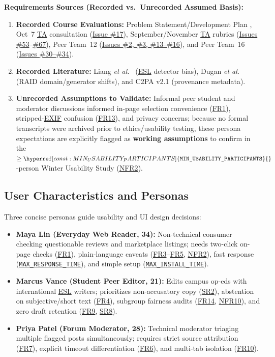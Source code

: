 \documentclass[11pt]{article}
\newcommand{\MinUsabilityParticipants}{\hyperref[const:MIN_USABILITY_PARTICIPANTS]{\texttt{MIN\_\allowbreak{}USABILITY\_\allowbreak{}PARTICIPANTS}}}
\newcommand{\MaxResponseTime}{\hyperref[const:MAX_RESPONSE_TIME]{\texttt{MAX\_\allowbreak{}RESPONSE\_\allowbreak{}TIME}}}
\newcommand{\MaxInstallTime}{\hyperref[const:MAX_INSTALL_TIME]{\texttt{MAX\_\allowbreak{}INSTALL\_\allowbreak{}TIME}}}
\newcommand{\ESL}{\hyperlink{acr-esl}{ESL}}
\newcommand{\EXIF}{\hyperlink{acr-exif}{EXIF}}
\newcommand{\TA}{\hyperlink{acr-ta}{TA}}
\begin{document}
\noindent\textbf{Requirements Sources (Recorded vs.\ Unrecorded Assumed Basis):}
\begin{enumerate}[leftmargin=*, noitemsep]
    \item \textbf{Recorded Course Evaluations:} Problem Statement/Development Plan \cite{VerityDevPlan2026}, Oct~7 \TA{} consultation (\href{https://github.com/richy1337/Verity/issues/17}{Issue \#17}), September/November \TA{} rubrics (\href{https://github.com/richy1337/Verity/issues/53}{Issues \#53}--\href{https://github.com/richy1337/Verity/issues/67}{\#67}), Peer Team~12 (\href{https://github.com/richy1337/Verity/issues/2}{Issues \#2, \#3, \#13--\#16}), and Peer Team~16 (\href{https://github.com/richy1337/Verity/issues/30}{Issues \#30--\#34}).
    \item \textbf{Recorded Literature:} Liang \emph{et al.}\ \cite{Liang2023ESL} (\ESL{} detector bias), Dugan \emph{et al.}\ \cite{RaidBenchmark2024} (RAID domain/generator shifts), and C2PA v2.1 \cite{C2PASpec2024} (provenance metadata).
    \item \textbf{Unrecorded Assumptions to Validate:} Informal peer student and moderator discussions informed in-page selection convenience (\hyperref[FR1]{FR1}), stripped-\EXIF{} confusion (\hyperref[FR13]{FR13}), and privacy concerns; because no formal transcripts were archived prior to ethics/usability testing, these persona expectations are explicitly flagged as \textbf{working assumptions} to confirm in the $\ge \MinUsabilityParticipants{}$-person Winter Usability Study (\hyperref[NFR2]{NFR2}).
\end{enumerate}

\subsection{User Characteristics and Personas}\label{subsec:user-profiles}

Three concise personas guide usability and UI design decisions:
\begin{itemize}[leftmargin=*, itemsep=3pt]
    \item \textbf{Maya Lin (Everyday Web Reader, 34):} Non-technical consumer checking questionable reviews and marketplace listings; needs two-click on-page checks (\hyperref[FR1]{FR1}), plain-language caveats (\hyperref[FR3]{FR3}--\hyperref[FR5]{FR5}, \hyperref[NFR2]{NFR2}), fast response (\MaxResponseTime{}), and simple setup (\MaxInstallTime{}).
    \item \textbf{Marcus Vance (Student Peer Editor, 21):} Edits campus op-eds with international \ESL{} writers; prioritizes non-accusatory copy (\hyperref[SR2]{SR2}), abstention on subjective/short text (\hyperref[FR4]{FR4}), subgroup fairness audits (\hyperref[FR14]{FR14}, \hyperref[NFR10]{NFR10}), and zero draft retention (\hyperref[FR9]{FR9}, \hyperref[SR8]{SR8}).
    \item \textbf{Priya Patel (Forum Moderator, 28):} Technical moderator triaging multiple flagged posts simultaneously; requires strict source attribution (\hyperref[FR7]{FR7}), explicit timeout differentiation (\hyperref[FR6]{FR6}), and multi-tab isolation (\hyperref[FR10]{FR10}).
\end{itemize}
\end{document}
